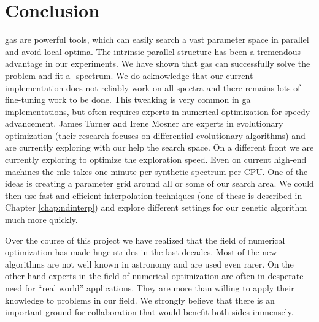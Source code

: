 \section{Conclusion}
\label{sec:dalek_conclusion}
\glspl{ga} are powerful tools, which can easily search a vast parameter space in parallel and avoid local optima. The intrinsic parallel structure has been a tremendous advantage in our experiments. We have shown that \glspl{ga} can successfully solve the problem and fit a \sneia-spectrum. We do acknowledge that our current implementation does not reliably work on all spectra and there remains lots of fine-tuning work to be done. This tweaking is very common in \gls{ga} implementations, but often requires experts in numerical optimization for speedy advancement. James Turner and Irene Mosner are experts in evolutionary optimization (their research focuses on differential evolutionary algorithms) and are currently exploring with our help the search space. 
On a different front we are currently exploring to optimize the exploration speed. Even on current high-end machines the \gls{mlc} takes one minute per synthetic spectrum per CPU. One of the ideas is creating a parameter grid around all or some of our search area. We could then use fast and efficient interpolation techniques (one of these is described in Chapter \ref{chap:ndinterp}) and explore different settings for our genetic algorithm much more quickly.

Over the course of this project we have realized that the field of numerical optimization has made huge strides in the last decades. Most of the new algorithms are not well known in astronomy and are used even rarer. On the other hand experts in the field of numerical optimization are often in desperate need for ``real world'' applications. They are more than willing to apply their knowledge to problems in our field. We strongly believe that there is an important ground for collaboration that would benefit both sides immensely.





